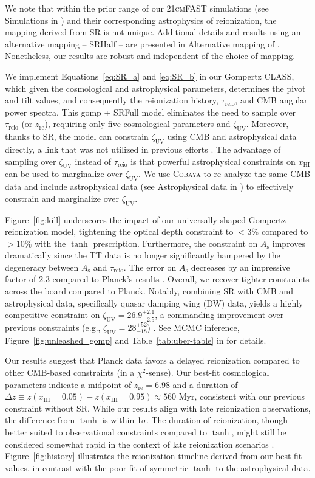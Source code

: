 \documentclass[12pt]{article}
\newcommand{\As}{A_\mathrm{s}}
\newcommand{\zetaUV}{\zeta_\mathrm{UV}}
\newcommand{\HI}{\mathrm{HI}}
\newcommand{\re}{\mathrm{re}}
\newcommand{\reio}{\mathrm{reio}}
\begin{document}
We note that within the prior range of our \textsc{21cmFAST} simulations
(see Simulations in \cite{methods}) and their corresponding astrophysics of
reionization, the mapping derived from SR is not unique.
Additional details and results using an alternative mapping -- SRHalf --
are presented in Alternative mapping of \cite{methods}.
Nonetheless, our results are robust and independent of the choice of
mapping.

We implement Equations~\eqref{eq:SR_a} and \eqref{eq:SR_b} in our Gompertz \textsc{CLASS},
which given the cosmological and astrophysical parameters, determines
the pivot and tilt values, and consequently the reionization history,
$\tau_\reio$, and CMB angular power spectra.
This gomp + SRFull model eliminates the need to sample over $\tau_\reio$
(or $z_\re$), requiring only five cosmological parameters and $\zetaUV$.
Moreover, thanks to SR, the model can constrain $\zetaUV$ using CMB and
astrophysical data directly, a link that was not utilized in
previous efforts \cite{Greig2017}.
The advantage of sampling over $\zetaUV$ instead of $\tau_\reio$ is that
powerful astrophysical constraints on $x_\HI$ can be used to marginalize
over $\zetaUV$.
We use \textsc{Cobaya} to re-analyze the same CMB data and include
astrophysical data (see Astrophysical data in \cite{methods}) to
effectively constrain and marginalize over $\zetaUV$.

Figure~\ref{fig:kill} underscores the impact of our universally-shaped
Gompertz reionization model, tightening the optical depth constraint to
$<3\%$ compared to $> 10\%$ with the $\tanh$ prescription.
Furthermore, the constraint on $\As$ improves dramatically since the TT
data is no longer significantly hampered by the degeneracy between $\As$
and $\tau_\reio$.
The error on $\As$ decreases by an impressive factor of 2.3 compared to
Planck's results \cite{Planck2020a}.
Overall, we recover tighter constraints across the board compared to
Planck.
Notably, combining SR with CMB and astrophysical data, specifically
quasar damping wing (DW) data, yields a highly competitive constraint on
$\zetaUV = 26.9^{+2.1}_{-2.5}$, a commanding improvement over previous
constraints (e.g., $\zetaUV = 28^{+52}_{-18}$) \cite{Greig2017}.
See MCMC inference, Figure~\ref{fig:unleashed_gomp} and Table~\ref{tab:uber-table} in
\cite{methods} for details.

Our results suggest that Planck data favors a delayed reionization
compared to other CMB-based constraints (in a $\chi^2$-sense).
Our best-fit cosmological parameters indicate a midpoint of $z_\re =
6.98$ and a duration of $\Delta z \equiv z(x_\HI = 0.05) - z(x_\HI =
0.95) \approx 560 $ Myr, consistent with our previous constraint
without SR.
While our results align with late reionization observations, the
difference from $\tanh$ is within 1$\sigma$.
The duration of reionization, though better suited to observational
constraints compared to $\tanh$, might still be considered somewhat
rapid in the context of late reionization scenarios \cite{Cain2021}.
Figure~\ref{fig:history} illustrates the reionization timeline derived from
our best-fit values, in contrast with the poor fit of symmetric $\tanh$
to the astrophysical data.
\end{document}
